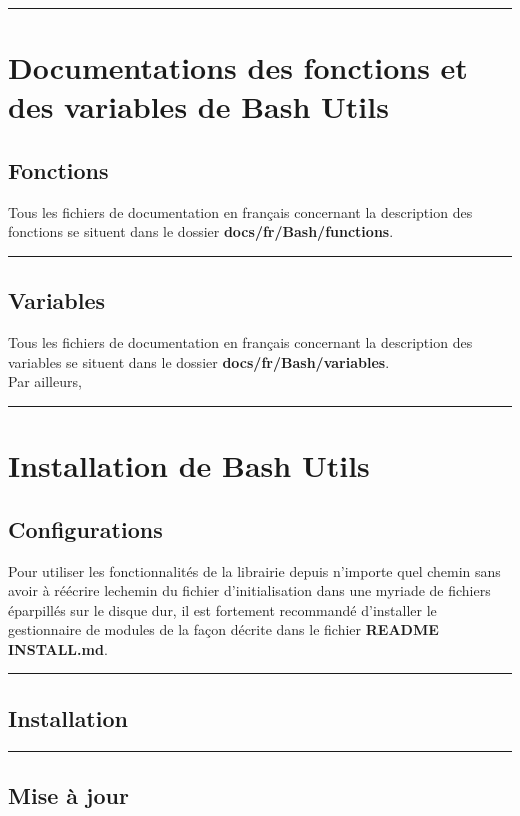 \documentclass[a4paper,10pt]{article}
\begin{document}
\color{red}\par\noindent\rule{\textwidth}{0.4pt}\color{white}

\color{red}
\section{Documentations des fonctions et des variables de Bash Utils}\color{white}

\color{green}
\subsection{Fonctions}\color{white}
Tous les fichiers de documentation en français concernant la description des fonctions se situent dans le dossier \color{lime}\textbf{docs/fr/Bash/functions}\color{white}.\\[1\baselineskip]



\color{green}\par\noindent\rule{\textwidth}{0.4pt}\color{white}

\color{green}
\subsection{Variables}\color{white}
Tous les fichiers de documentation en français concernant la description des variables se situent dans le dossier \color{lime}\textbf{docs/fr/Bash/variables}\color{white}.\\[1\baselineskip]

Par ailleurs, \\[1\baselineskip]

\color{red}\par\noindent\rule{\textwidth}{0.4pt}\color{white}

\color{red}
\section{Installation de Bash Utils}\color{white}

\color{green}
\subsection{Configurations}\color{white}
Pour utiliser les fonctionnalités de la librairie depuis n'importe quel chemin sans avoir à réécrire le\linebreak chemin du fichier d'initialisation dans une myriade de fichiers éparpillés sur le disque dur, il est fortement recommandé d'installer le gestionnaire de modules de la façon décrite dans le fichier \textbf{\color{lime}README INSTALL.md\color{white}}.\\[1\baselineskip]



\color{green}\par\noindent\rule{\textwidth}{0.4pt}\color{white}

\color{green}
\subsection{Installation}\color{white}



\color{green}\par\noindent\rule{\textwidth}{0.4pt}\color{white}

\color{green}
\subsection{Mise à jour}\color{white}
\end{document}
